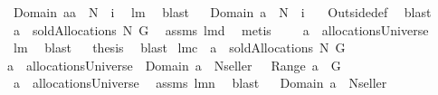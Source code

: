 \begin{isabellebody}
\ {\isachardoublequoteopen}Domain\ aa\ {\isasymsubseteq}\ N\ {\isasymunion}\ {\isacharbraceleft}{\isacharquery}i{\isacharbraceright}{\isachardoublequoteclose}\ \isamarkupfalse%
\ lm{}{}\ \isamarkupfalse%
\ blast\isanewline
{}\isamarkupfalse%
\ \isamarkupfalse%
\ {\isachardoublequoteopen}Domain\ a\ {\isasymsubseteq}\ N\ {\isacharminus}\ {\isacharbraceleft}{\isacharquery}i{\isacharbraceright}{\isachardoublequoteclose}\ \isamarkupfalse%
\ {}\ Outside{\isacharunderscore}def\ \isamarkupfalse%
\ blast\isanewline
{}\isamarkupfalse%
\ \isamarkupfalse%
\ {\isachardoublequoteopen}a\ {\isasymin}\ soldAllocations\ N\ G{\isachardoublequoteclose}\ \isamarkupfalse%
\ assms\ lm{}{}d\ \isamarkupfalse%
\ metis\isanewline
{}\isamarkupfalse%
\ \isamarkupfalse%
\ \isamarkupfalse%
\ {\isachardoublequoteopen}a\ {\isasymin}\ allocationsUniverse{\isachardoublequoteclose}\ \isamarkupfalse%
\ lm{}{}\ \isamarkupfalse%
\ blast\isanewline
{}\isamarkupfalse%
\ \isamarkupfalse%
\ {\isacharquery}thesis\ \isamarkupfalse%
\ blast\isanewline
{}\isamarkupfalse%
%
\endisatagproof
{\isafoldproof}%
%
\isadelimproof
\isanewline
%
\endisadelimproof
\isanewline
{}\isamarkupfalse%
\ lm{}{}c{\isacharcolon}\ \ {\isachardoublequoteopen}a\ {\isasymin}\ soldAllocations{\isacharprime}{\isacharprime}\ N\ G{\isachardoublequoteclose}\ \ \isanewline
{\isachardoublequoteopen}a\ {\isasymin}\ allocationsUniverse\ {\isacharampersand}\ Domain\ a\ {\isasymsubseteq}\ N{\isacharminus}{\isacharbraceleft}seller{\isacharbraceright}\ {\isacharampersand}\ {\isasymUnion}\ Range\ a\ {\isasymsubseteq}\ G{\isachardoublequoteclose}\isanewline
%
\isadelimproof
%
\endisadelimproof
%
\isatagproof
{}\isamarkupfalse%
\ {\isacharminus}\isanewline
{}\isamarkupfalse%
\ {\isachardoublequoteopen}a\ {\isasymin}\ allocationsUniverse{\isachardoublequoteclose}\ \isamarkupfalse%
\ assms\ lm{}{}n\ \isamarkupfalse%
\ blast\isanewline
{}\isamarkupfalse%
\ \isamarkupfalse%
\ {\isachardoublequoteopen}Domain\ a\ {\isasymsubseteq}\ N{\isacharminus}{\isacharbraceleft}seller{\isacharbraceright}{\isachardoublequoteclose}\ \isamarkupfalse%

\end{isabellebody}
